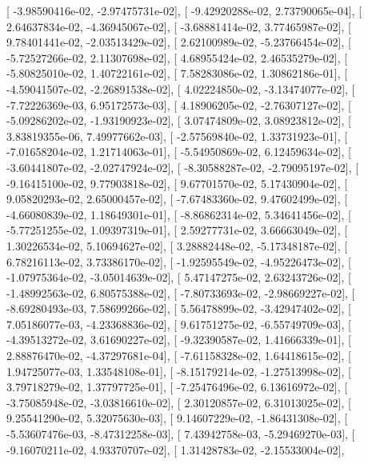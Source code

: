 \documentclass{article}
\begin{document}
       [ -3.98590416e-02,  -2.97475731e-02],
       [ -9.42920288e-02,   2.73790065e-04],
       [  2.64637834e-02,  -4.36945067e-02],
       [ -3.68881414e-02,   3.77465987e-02],
       [  9.78401441e-02,  -2.03513429e-02],
       [  2.62100989e-02,  -5.23766454e-02],
       [ -5.72527266e-02,   2.11307698e-02],
       [  4.68955424e-02,   2.46535279e-02],
       [ -5.80825010e-02,   1.40722161e-02],
       [  7.58283086e-02,   1.30862186e-01],
       [ -4.59041507e-02,  -2.26891538e-02],
       [  4.02224850e-02,  -3.13474077e-02],
       [ -7.72226369e-03,   6.95172573e-03],
       [  4.18906205e-02,  -2.76307127e-02],
       [ -5.09286202e-02,  -1.93190923e-02],
       [  3.07474809e-02,   3.08923812e-02],
       [  3.83819355e-06,   7.49977662e-03],
       [ -2.57569840e-02,   1.33731923e-01],
       [ -7.01658204e-02,   1.21714063e-01],
       [ -5.54950869e-02,   6.12459634e-02],
       [ -3.60441807e-02,  -2.02747924e-02],
       [ -8.30588287e-02,  -2.79095197e-02],
       [ -9.16415100e-02,   9.77903818e-02],
       [  9.67701570e-02,   5.17430904e-02],
       [  9.05820293e-02,   2.65000457e-02],
       [ -7.67483360e-02,   9.47602499e-02],
       [ -4.66080839e-02,   1.18649301e-01],
       [ -8.86862314e-02,   5.34641456e-02],
       [ -5.77251255e-02,   1.09397319e-01],
       [  2.59277731e-02,   3.66663049e-02],
       [  1.30226534e-02,   5.10694627e-02],
       [  3.28882448e-02,  -5.17348187e-02],
       [  6.78216113e-02,   3.73386170e-02],
       [ -1.92595549e-02,  -4.95226473e-02],
       [ -1.07975364e-02,  -3.05014639e-02],
       [  5.47147275e-02,   2.63243726e-02],
       [ -1.48992563e-02,   6.80575388e-02],
       [ -7.80733693e-02,  -2.98669227e-02],
       [ -8.69280493e-03,   7.58699266e-02],
       [  5.56478899e-02,  -3.42947402e-02],
       [  7.05186077e-03,  -4.23368836e-02],
       [  9.61751275e-02,  -6.55749709e-03],
       [ -4.39513272e-02,   3.61690227e-02],
       [ -9.32390587e-02,   1.41666339e-01],
       [  2.88876470e-02,  -4.37297681e-04],
       [ -7.61158328e-02,   1.64418615e-02],
       [  1.94725077e-03,   1.33548108e-01],
       [ -8.15179214e-02,  -1.27513998e-02],
       [  3.79718279e-02,   1.37797725e-01],
       [ -7.25476496e-02,   6.13616972e-02],
       [ -3.75085948e-02,  -3.03816610e-02],
       [  2.30120857e-02,   6.31013025e-02],
       [  9.25541290e-02,   5.32075630e-03],
       [  9.14607229e-02,  -1.86431308e-02],
       [ -5.53607476e-03,  -8.47312258e-03],
       [  7.43942758e-03,  -5.29469270e-03],
       [ -9.16070211e-02,   4.93370707e-02],
       [  1.31428783e-02,  -2.15533004e-02],
\end{document}
